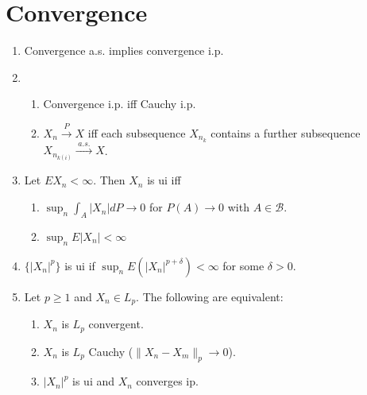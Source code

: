 \documentclass{article}
\newcommand{\as}{\;a.s.\;}
\newcommand{\pto}{\overset{P}{\to}}
\newcommand{\asto}{\overset{\as}{\to}}
\newcommand{\B}{\mathcal{B}}
\begin{document}
\section{Convergence}
\begin{enumerate}
\item Convergence a.s. implies convergence i.p.
\item
  \begin{enumerate}
  \item Convergence i.p. iff Cauchy i.p.
  \item $X_n \pto X$ iff each subsequence ${X_{n_k}}$ contains a
    further subsequence $X_{n_{k(i)}} \asto X$.
  \end{enumerate}
\item Let $EX_n < \infty$. Then ${X_n}$ is ui iff
  \begin{enumerate}
  \item $\sup_n \int_A |X_n| dP \to 0$ for $P(A) \to 0$ with
    $A \in \B$.
  \item $\sup_n E|X_n| < \infty$
  \end{enumerate}
\item $\{|X_n|^p\}$ is ui if $\sup_n E(|X_n|^{p+\delta}) < \infty$ for
  some $\delta > 0$.
\item Let $p \geq 1$ and $X_n \in L_p$. The following are equivalent:
  \begin{enumerate}
  \item $X_n$ is $L_p$ convergent.
  \item $X_n$ is $L_p$ Cauchy ($\|X_n - X_m\|_p \to 0$).
  \item $|X_n|^p$ is ui and $X_n$ converges ip.
  \end{enumerate}
\end{enumerate}
\end{document}
